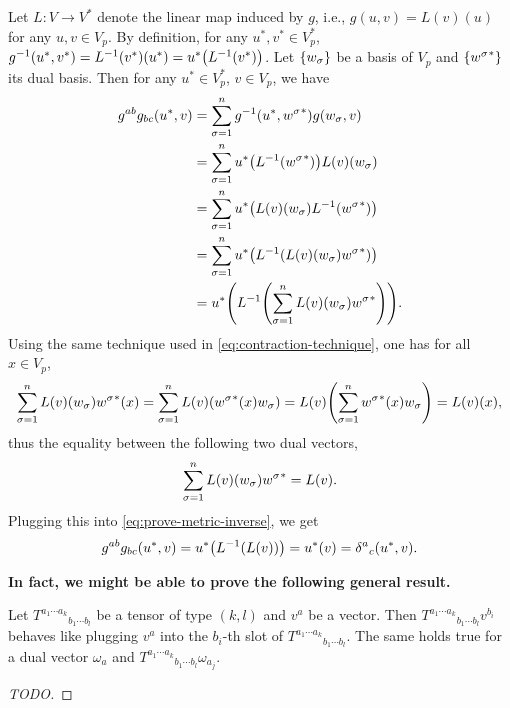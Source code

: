 \documentclass{note}
\numberwithin{equation}{chapter}
\begin{document}
Let $L\colon V\to V^*$ denote the linear map induced by $g$, i.e., $g(u, v) =
L(v)(u)$ for any $u, v \in V_p$. By definition, for any $u^*, v^* \in V_p^*$,
$g^{-1}(u^*, v^*) = L^{-1}(v^*)(u^*) = u^*\prn{L^{-1}(v^*)}$. Let $\set{w_\sigma}$
be a basis of $V_p$ and $\set{{w^\sigma}^*}$ its dual basis. Then for any $u^* \in
V_p^*$, $v \in V_p$, we have
\begin{align}
  g^{ab}g_{bc}(u^*, v)
   & = \sum_{\sigma=1}^n g^{-1}\prn{u^*, {w^\sigma}^*} g(w_\sigma, v) \notag     \\
   & = \sum_{\sigma=1}^n u^*\prn{L^{-1}\prn{{w^\sigma}^*}} L(v)(w_\sigma) \notag \\
   & = \sum_{\sigma=1}^n u^*\prn{L(v)\prn{w_\sigma}L^{-1}({w^\sigma}^*)} \notag  \\
   & = \sum_{\sigma=1}^n u^*\prn{L^{-1}\prn{L(v)(w_\sigma){w^\sigma}^*}} \notag  \\
   & = u^*\prn{L^{-1}\prn{\sum_{\sigma=1}^n L(v)\prn{w_\sigma}{w^\sigma}^*}}.
  \label{eq:prove-metric-inverse}
\end{align}
Using the same technique used in \eqref{eq:contraction-technique}, one has for all
$x \in V_p$,
\begin{equation*}
  \sum_{\sigma=1}^n L(v)\prn{w_\sigma}{w^\sigma}^*(x) = \sum_{\sigma=1}^n
  L(v)\prn{{w^\sigma}^*(x) w_\sigma} = L(v)\prn{\sum_{\sigma=1}^n {w^\sigma}^*(x)
  w_\sigma} = L(v)(x),
\end{equation*}
thus the equality between the following two dual vectors,
\begin{equation*}
  \sum_{\sigma=1}^n L(v)\prn{w_\sigma}{w^\sigma}^* = L(v).
\end{equation*}
Plugging this into \eqref{eq:prove-metric-inverse}, we get
\begin{equation*}
  g^{ab}g_{bc}(u^*, v) = u^*\prn{L^{-1}(L(v))} = u^*(v) = {\delta^a}_c\prn{u^*,v}.
\end{equation*}

{\bfseries In fact, we might be able to prove the following general result.}
\begin{lemma*}
  Let ${T^{a_1\cdots a_k}}_{b_1\cdots b_l}$ be a tensor of type $(k,l)$ and $v^a$ be
  a vector. Then ${T^{a_1\cdots a_k}}_{b_1\cdots b_l}v^{b_i}$ behaves like plugging
  $v^a$ into the $b_i$-th slot of ${T^{a_1\cdots a_k}}_{b_1\cdots b_l}$. The same
  holds true for a dual vector $\omega_a$ and ${T^{a_1\cdots a_k}}_{b_1\cdots
  b_l}\omega_{a_j}$.
\end{lemma*}

\begin{proof}
  [TODO]
\end{proof}
\end{document}
